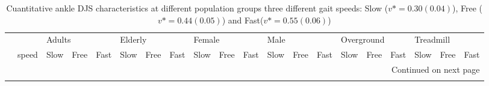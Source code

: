 \begin{longtable}{llrrrrrrrrrrrrrrrrrr}
\caption{Cuantitative ankle DJS characteristics at different population groups three different gait speeds: Slow ($v*=0.30(0.04)$), Free ($v*=0.44(0.05)$) and Fast($v*=0.55(0.06)$)}\label{tab:table2}\\
\toprule
   & {} & \multicolumn{3}{l}{Adults} & \multicolumn{3}{l}{Elderly} & \multicolumn{3}{l}{Female} & \multicolumn{3}{l}{Male} & \multicolumn{3}{l}{Overground} & \multicolumn{3}{l}{Treadmill} \\
   & speed &       Slow &       Free &       Fast &       Slow &       Free &       Fast &       Slow &       Free &       Fast &       Slow &       Free &       Fast &       Slow &       Free &       Fast &       Slow &       Free &       Fast \\
\midrule
\endhead
\midrule
\multicolumn{20}{r}{{Continued on next page}} \\
\midrule
\endfoot


\end{longtable}
